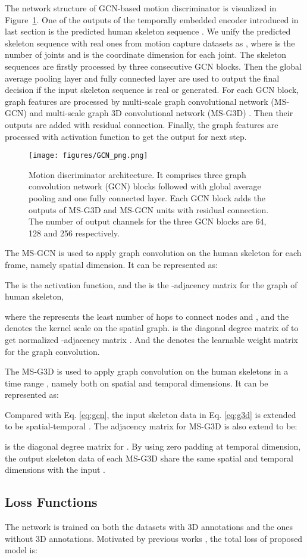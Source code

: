 \documentclass[10pt,twocolumn,letterpaper]{article}
\newcommand{\gcn}{
\begin{figure}[t]
  \centering
  \texttt{[image: figures/GCN\_png.png]}
  \caption{Motion discriminator architecture. It comprises three graph convolution network (GCN) blocks followed with global average pooling and one fully connected layer. Each GCN block adds the outputs of MS-G3D and MS-GCN units with residual connection. The number of output channels  for the three GCN blocks are 64, 128 and 256 respectively.}
  \label{fig:gcn}
\end{figure}
}
\newcommand{\figref}[1]{Figure~\ref{fig:#1}}
\begin{document}
The network structure of GCN-based motion discriminator is visualized in \figref{gcn}. One of the outputs of the temporally embedded encoder introduced in last section is the predicted human skeleton sequence . We unify the predicted skeleton sequence with real ones from motion capture datasets as , where  is the number of joints and  is the coordinate dimension for each joint. The skeleton sequences are firstly processed by three consecutive GCN blocks. Then the global average pooling layer and fully connected layer are used to output the final decision if the input skeleton sequence is real or generated. For each GCN block, graph features are processed by multi-scale graph convolutional network (MS-GCN) \cite{chaolong2018spatio} and multi-scale graph 3D convolutional network (MS-G3D) \cite{liu2020disentangling}. Then their outputs are added with residual connection. Finally, the graph features are processed with activation function to get the output for next step.

\gcn


The MS-GCN is used to apply graph convolution on the human skeleton for each frame, namely spatial dimension. It can be represented as: 

The  is the activation function, and the  is the -adjacency matrix for the graph of human skeleton,

where the  represents the least number of hops to connect nodes  and , and the  denotes the kernel scale on the spatial graph.  is the diagonal degree matrix of  to get normalized -adjacency matrix  \cite{kipf2016semi}. And the  denotes the learnable weight matrix for the graph convolution.


The MS-G3D is used to apply graph convolution on the human skeletons in a time range , namely both on spatial and temporal dimensions. It can be represented as:
\begin{footnotesize}

\end{footnotesize}
Compared with Eq. \ref{eq:gcn}, the input skeleton data in Eq. \ref{eq:g3d} is extended to be spatial-temporal . The adjacency matrix for MS-G3D is also extend to be: 


 is the diagonal degree matrix for . By using zero padding at temporal dimension, the output skeleton data of each MS-G3D share the same spatial and temporal dimensions with the input .




\subsection{Loss Functions}
The network is trained on both the datasets with 3D annotations and the ones without 3D annotations. Motivated by previous works \cite{kocabas2020vibe}, the total loss of proposed model is:
\end{document}

